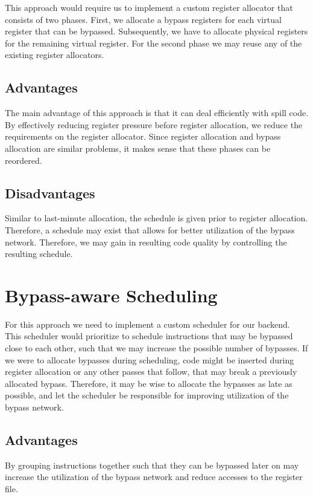 This approach would require us to implement a custom register allocator that consists of two phases. First, we allocate a bypass registers for each virtual register that can be bypassed. Subsequently, we have to allocate physical registers for the remaining virtual register. For the second phase we may reuse any of the existing register allocators. 

\subsection{Advantages}
The main advantage of this approach is that it can deal efficiently with spill code. By effectively reducing register pressure before register allocation, we reduce the requirements on the register allocator.  
Since register allocation and bypass allocation are similar problems, it makes sense that these phases can be reordered. 

\subsection{Disadvantages}
Similar to last-minute allocation, the schedule is given prior to register allocation. Therefore, a schedule may exist that allows for better utilization of the bypass network. Therefore, we may gain in resulting code quality by controlling the resulting schedule.

\section{Bypass-aware Scheduling}\label{sec:scheduling_approach}
For this approach we need to implement a custom scheduler for our backend. This scheduler would prioritize to schedule instructions that may be bypassed close to each other, such that we may increase the possible number of bypasses. If we were to allocate bypasses during scheduling, code might be inserted during register allocation or any other passes that follow, that may break a previously allocated bypass. Therefore, it may be wise to allocate the bypasses as late as possible, and let the scheduler be responsible for improving utilization of the bypass network. 

\subsection{Advantages}
By grouping instructions together such that they can be bypassed later on may increase the utilization of the bypass network and reduce accesses to the register file.

